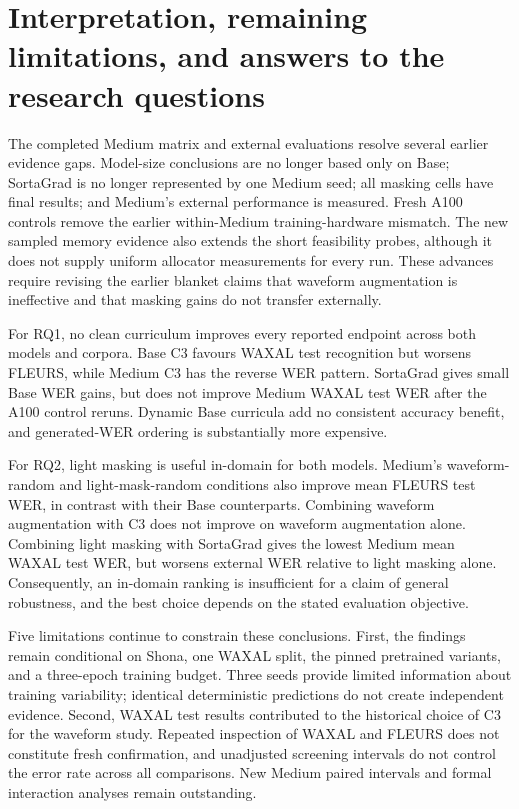 \documentclass[12pt,a4paper]{report}
\begin{document}
\section{Interpretation, remaining limitations, and answers to the research questions}

The completed Medium matrix and external evaluations resolve several earlier
evidence gaps. Model-size conclusions are no longer based only on Base;
SortaGrad is no longer represented by one Medium seed; all masking cells
have final results; and Medium's external performance is measured. Fresh
A100 controls remove the earlier within-Medium training-hardware mismatch.
The new sampled memory evidence also extends the short feasibility probes,
although it does not supply uniform allocator measurements for every run.
These advances require revising the earlier blanket claims that waveform
augmentation is ineffective and that masking gains do not transfer externally.

For RQ1, no clean curriculum improves every reported endpoint across both
models and corpora. Base C3 favours WAXAL test recognition but worsens
FLEURS, while Medium C3 has the reverse WER pattern. SortaGrad gives small
Base WER gains, but does not improve Medium WAXAL test WER after the A100
control reruns. Dynamic Base curricula add no consistent accuracy benefit,
and generated-WER ordering is substantially more expensive.

For RQ2, light masking is useful in-domain for both models. Medium's
waveform-random and light-mask-random conditions also improve mean FLEURS
test WER, in contrast with their Base counterparts. Combining waveform
augmentation with C3 does not improve on waveform augmentation alone.
Combining light masking with SortaGrad gives the lowest Medium mean WAXAL
test WER, but worsens external WER relative to light masking alone.
Consequently, an in-domain ranking is insufficient for a claim of general
robustness, and the best choice depends on the stated evaluation objective.

Five limitations continue to constrain these conclusions. First, the findings
remain conditional on Shona, one WAXAL split, the pinned pretrained variants,
and a three-epoch training budget. Three seeds provide limited information
about training variability; identical deterministic predictions do not create
independent evidence. Second, WAXAL test results contributed to the historical
choice of C3 for the waveform study. Repeated inspection of WAXAL and FLEURS
does not constitute fresh confirmation, and unadjusted screening intervals
do not control the error rate across all comparisons. New Medium paired
intervals and formal interaction analyses remain outstanding.
\end{document}
